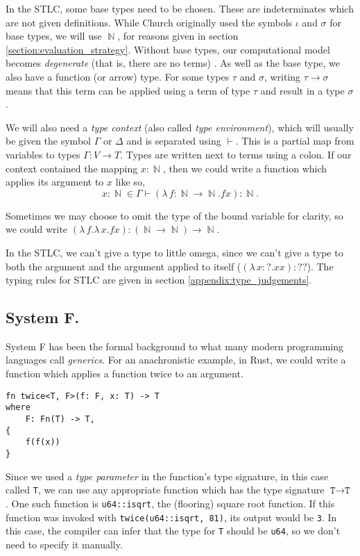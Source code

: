 \documentclass[logo,bsc,singlespacing,parskip,online]{infthesis}
\DeclareMathOperator{\nat}{\mathbb{N}}
\begin{document}
In the STLC, some base types need to be chosen. These are indeterminates which are not given
definitions. While Church originally used the symbols $\iota$ and $\sigma$ for base types, we will
use $\nat$, for reasons given in section \ref{section:evaluation_strategy}. Without base types, our
computational model becomes \textit{degenerate} (that is, there are no terms)
\citep{pierce_types_2002}. As well as the base type, we also have a function (or arrow) type. For
some types $\tau$ and $\sigma$, writing $\tau \to \sigma$ means that this term can be applied using
a term of type $\tau$ and result in a type $\sigma$.

We will also need a \textit{type context} (also called \textit{type environment}), which will
usually be given the symbol $\Gamma$ or $\Delta$ and is separated using $\vdash$. This is a partial
map from variables to types $\Gamma \colon V \to T$. Types are written next to terms using a colon.
If our context contained the mapping $x \colon \nat$, then we could write a function which applies
its argument to $x$ like so,
\begin{equation*}
  x \colon \nat \in \Gamma \vdash (\lambda \, f \colon \nat \to \nat . f x) \colon \nat.
\end{equation*}

Sometimes we may choose to omit the type of the bound variable for clarity, so we could write
$(\lambda \, f. \lambda \, x. fx) \colon (\nat \to \nat) \to \nat$.

In the STLC, we can't give a type to little omega, since we can't give a type to both the argument
and the argument applied to itself ($(\lambda \, x  \colon ? . x x) \colon ??$). The typing rules for
STLC are given in section \ref{appendix:type_judgements}.

\subsection{System F.}
System F has been the formal background to what many modern programming
languages call \textit{generics}. For an anachronistic example, in Rust, we could write a function
which applies a function twice to an argument.

\begin{verbatim}
fn twice<T, F>(f: F, x: T) -> T
where
    F: Fn(T) -> T,
{
    f(f(x))
}
\end{verbatim}

Since we used a \textit{type parameter} in the function's type signature, in this case called
\texttt{T}, we can use any appropriate function which has the type signature $\texttt{T} \to
\texttt{T}$. One such function is \texttt{u64::isqrt}, the (flooring) square root function. If this
function was invoked with \texttt{twice(u64::isqrt, 81)}, its output would be \texttt{3}. In this
case, the compiler can infer that the type for \texttt{T} should be \texttt{u64}, so
we don't need to specify it manually.
\end{document}
